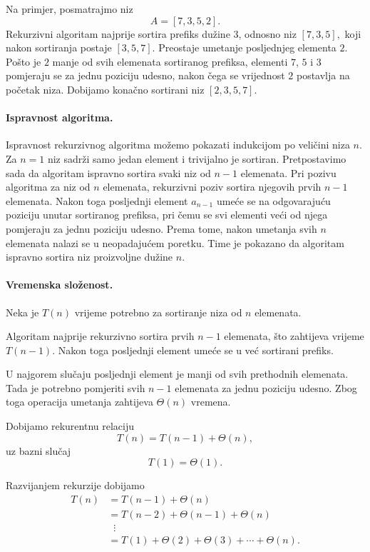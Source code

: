  
 Na primjer, posmatrajmo niz
 \[
 A=[7,3,5,2].
 \]
 Rekurzivni algoritam najprije sortira prefiks dužine $3$,
 odnosno niz $
 [7,3,5],$
 koji nakon sortiranja postaje $
 [3,5,7].$ 
 Preostaje umetanje posljednjeg elementa $2$. Pošto je $2$ manje od svih
 elemenata sortiranog prefiksa, elementi $7$, $5$ i $3$ pomjeraju se za jednu
 poziciju udesno, nakon čega se vrijednost $2$ postavlja na početak niza.
 Dobijamo konačno sortirani niz $
 [2,3,5,7].$
 
 \paragraph{Ispravnost algoritma.} Ispravnost rekurzivnog algoritma možemo pokazati indukcijom po veličini
 niza $n$. Za $n=1$ niz sadrži samo jedan element i trivijalno je sortiran.  Pretpostavimo sada da algoritam ispravno sortira svaki niz od $n-1$
 elemenata. Pri pozivu algoritma za niz od $n$ elemenata, rekurzivni poziv
 sortira njegovih prvih $n-1$ elemenata. Nakon toga posljednji element
 $a_{n-1}$ umeće se na odgovarajuću poziciju unutar sortiranog prefiksa,
 pri čemu se svi elementi veći od njega pomjeraju za jednu poziciju udesno.
 Prema tome, nakon umetanja svih $n$ elemenata nalazi se u neopadajućem
 poretku. Time je pokazano da algoritam ispravno sortira niz proizvoljne
 dužine $n$.
 
 \paragraph{Vremenska složenost.}
 Neka je $T(n)$ vrijeme potrebno za sortiranje niza od $n$ elemenata.
 
 Algoritam najprije rekurzivno sortira prvih $n-1$ elemenata, što zahtijeva
 vrijeme $T(n-1)$. Nakon toga posljednji element umeće se u već sortirani
 prefiks.
 
 U najgorem slučaju posljednji element je manji od svih prethodnih elemenata.
 Tada je potrebno pomjeriti svih $n-1$ elemenata za jednu poziciju udesno.
 Zbog toga operacija umetanja zahtijeva $\Theta(n)$ vremena.
 
 Dobijamo rekurentnu relaciju
 \[
 T(n)=T(n-1)+\Theta(n),
 \]
 uz bazni slučaj
 \[
 T(1)=\Theta(1).
 \]
 
 Razvijanjem rekurzije dobijamo
 \[
 \begin{aligned}
 	T(n)
 	&= T(n-1)+\Theta(n)\\
 	&= T(n-2)+\Theta(n-1)+\Theta(n)\\
 	&\;\;\vdots\\
 	&= T(1)+\Theta(2)+\Theta(3)+\cdots+\Theta(n).
 \end{aligned}
 \]
 
